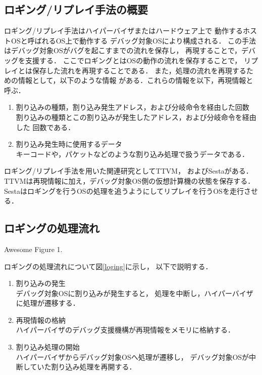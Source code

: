 \documentclass[tanilab-enum]{graduate}
\begin{document}
    \subsection{ロギング/リプレイ手法の概要}
    ロギング/リプレイ手法はハイパーバイザまたはハードウェア上で
    動作するホストOSと呼ばれるOS上で動作する
    デバッグ対象OSにより構成される．
    この手法はデバッグ対象OSがバグを起こすまでの流れを保存し，
    再現することで，デバッグを支援する．
    ここでロギングとはOSの動作の流れを保存することで，
    リプレイとは保存した流れを再現することである．
    また，処理の流れを再現するための情報として，以下のような情報
    がある．これらの情報を以下，再現情報と呼ぶ．
    \begin{enumerate}
        \item 割り込みの種類，割り込み発生アドレス，および分岐命令を経由した回数\\
            割り込みの種類とこの割り込みが発生したアドレス，および分岐命令を経由した
            回数である．
        \item 割り込み発生時に使用するデータ\\
            キーコードや，パケットなどのような割り込み処理で扱うデータである．
    \end{enumerate}
    ロギング/リプレイ手法を用いた関連研究としてTTVM\cite{samuel}，
    およびSesta\cite{kawasaki}がある．
    TTVMは再現情報に加え，デバッグ対象OS側の仮想計算機の状態を保存する．
    Sestaはロギングを行うOSの処理を追うようにしてリプレイを行うOSを走行させる．

    \subsection{ロギングの処理流れ}
    {Awesome Figure 1.}

    ロギングの処理流れについて図\ref{loging}に示し，
    以下で説明する．
    \begin{enumerate}
        \item 割り込みの発生\\
            デバッグ対象OSに割り込みが発生すると，
            処理を中断し，ハイパーバイザに処理が遷移する．
        \item 再現情報の格納\\
            ハイパーバイザのデバッグ支援機構が再現情報をメモリに格納する．
        \item 割り込み処理の開始\\
            ハイパーバイザからデバッグ対象OSへ処理が遷移し，
            デバッグ対象OSが中断していた割り込み処理を再開する．
    \end{enumerate}
\end{document}
